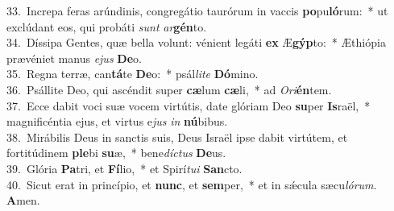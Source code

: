 {33.~}Increpa feras arúndinis, congregátio taurórum in vaccis \textbf{po}pu\textbf{ló}rum:~* ut exclúdant eos, qui probáti \textit{sunt} \textit{ar}\textbf{gén}to.\\
{34.~}Díssipa Gentes, quæ bella volunt: vénient legáti \textbf{ex} Æ\textbf{gýp}to:~* Æthiópia prævéniet manus \textit{e}\textit{jus} \textbf{De}o.\\
{35.~}Regna terræ, can\textbf{tá}te \textbf{De}o:~* psál\textit{li}\textit{te} \textbf{Dó}mino.\\
{36.~}Psállite Deo, qui ascéndit super \textbf{cæ}lum \textbf{cæ}li,~* ad \textit{O}\textit{ri}\textbf{én}tem.\\
{37.~}Ecce dabit voci suæ vocem virtútis, date glóriam Deo \textbf{su}per \textbf{Is}raël,~* magnificéntia ejus, et virtus e\textit{jus} \textit{in} \textbf{nú}bibus.\\
{38.~}Mirábilis Deus in sanctis suis, Deus Israël ipse dabit virtútem, et fortitúdinem \textbf{ple}bi \textbf{su}æ,~* bene\textit{dí}\textit{ctus} \textbf{De}us.\\
{39.~}Glória \textbf{Pa}tri, et \textbf{Fí}lio,~* et Spirí\textit{tu}\textit{i} \textbf{San}cto.\\
{40.~}Sicut erat in princípio, et \textbf{nunc}, et \textbf{sem}per,~* et in sǽcula sæcu\textit{ló}\textit{rum}. \textbf{A}men.\\
